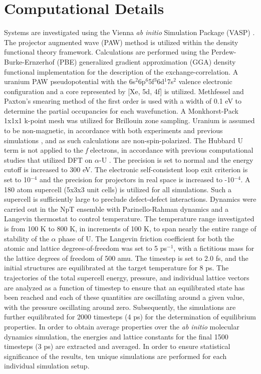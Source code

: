 \documentclass[review]{elsarticle}
\begin{document}
\section{Computational Details}
Systems are investigated using the Vienna \textit{ab initio} Simulation Package (VASP) \cite{vasp1, vasp2, vasp3, vasp4}. The projector augmented wave (PAW) method \cite{paw1, paw2} is utilized within the density functional theory \cite{dft1, dft2} framework. Calculations are performed using the Perdew-Burke-Ernzerhof (PBE) \cite{pbe1, pbe2} generalized gradient approximation (GGA) density functional implementation for the description of the exchange-correlation. A uranium PAW pseudopotential with the 6s$^{2}$6p$^{6}$5f$^{3}$6d$^{1}$7s$^{2}$ valence electronic configuration and a core represented by [Xe, 5d, 4f] is utilized. Methfessel and Paxton's smearing method \cite{methfessel} of the first order is used with a width of 0.1 eV to determine the partial occupancies for each wavefunction. A Monkhorst-Pack \cite{monkhorst} 1x1x1 k-point mesh was utilized for Brillouin zone sampling. Uranium is assumed to be non-magnetic, in accordance with both experiments \cite{chembook} and previous simulations \cite{beeler2013}, and as such calculations are non-spin-polarized. The Hubbard U term is not applied to the \textit{f} electrons, in accordance with previous computational studies that utilized DFT on $\alpha$-U \cite{wirth2011, wirth2012, taylor2008, beeler2013}. The precision is set to normal and the energy cutoff is increased to 300 eV. The electronic self-consistent loop exit criterion is set to 10$^{-4}$ and the precision for projectors in real space is increased to -10$^{-4}$. A 180 atom supercell (5x3x3 unit cells) is utilized for all simulations. Such a supercell is sufficiently large to preclude defect-defect interactions. Dynamics were carried out in the NpT ensemble with Parinello-Rahman dynamics and a Langevin thermostat to control temperature. The temperature range investigated is from 100 K to 800 K, in increments of 100 K, to span nearly the entire range of stability of the $\alpha$ phase of U. The Langevin friction coefficient for both the atomic and lattice degrees-of-freedom was set to 5 ps$^{-1}$, with a fictitious mass for the lattice degrees of freedom of 500 amu. The timestep is set to 2.0 fs, and the initial structures are equilibrated at the target temperature for 8 ps. The trajectories of the total supercell energy, pressure, and individual lattice vectors are analyzed as a function of timestep to ensure that an equilibrated state has been reached and each of these quantities are oscillating around a given value, with the pressure oscillating around zero. Subsequently, the simulations are further equilibrated for 2000 timesteps (4 ps) for the determination of equilibrium properties. In order to obtain average properties over the \textit{ab initio} molecular dynamics simulation, the energies and lattice constants for the final 1500 timesteps (3 ps) are extracted and averaged. In order to ensure statistical significance of the results, ten unique simulations are performed for each individual simulation setup. 
\end{document}
